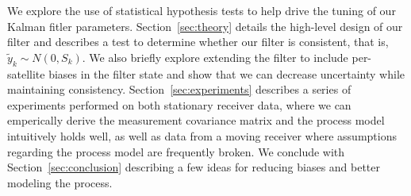 We explore the use of statistical hypothesis tests to help drive the tuning of our Kalman fitler parameters.  Section~\ref{sec:theory} details the high-level design of our filter and describes a test to determine whether our filter is consistent, that is, $\tilde{y}_k \sim N(0,S_k)$.  We also briefly explore extending the filter to include per-satellite biases in the filter state and show that we can decrease uncertainty while maintaining consistency.  Section~\ref{sec:experiments} describes a series of experiments performed on both stationary receiver data, where we can emperically derive the measurement covariance matrix and the process model intuitively holds well, as well as data from a moving receiver where assumptions regarding the process model are frequently broken.  We conclude with Section~\ref{sec:conclusion} describing a few ideas for reducing biases and better modeling the process.
